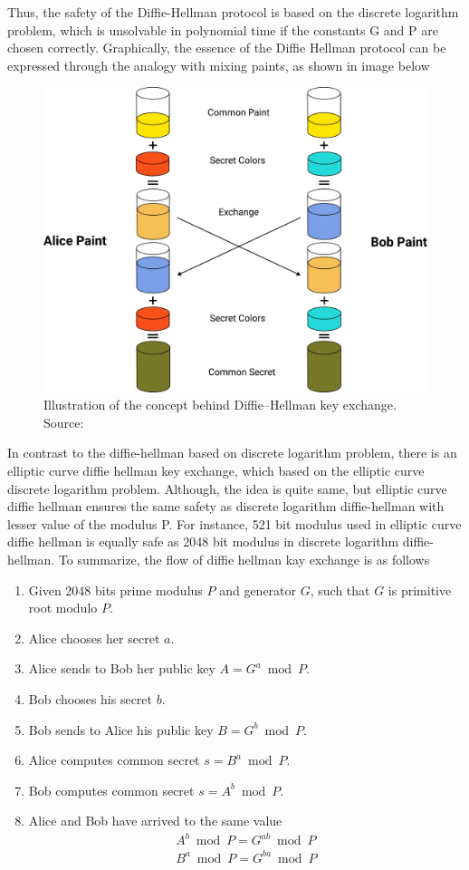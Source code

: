 Thus, the safety of the Diffie-Hellman protocol is based on the discrete logarithm problem, which is unsolvable
in polynomial time if the constants G and P are chosen correctly.
Graphically, the essence of the Diffie Hellman protocol can be expressed through the analogy with mixing paints, as shown in
image below
\begin{figure}[H]
    \centering
    \includegraphics[width=1\textwidth]{Pictures/Diffie-Hellman}
    \caption{Illustration of the concept behind Diffie–Hellman key exchange. Source: }\label{fig:figure4}
\end{figure}
In contrast to the diffie-hellman based on discrete logarithm problem, there is an elliptic curve diffie hellman
key exchange, which based on the elliptic curve discrete logarithm problem.
Although, the idea is quite same, but elliptic curve diffie hellman ensures the same safety as discrete logarithm
diffie-hellman with lesser value of the modulus P.
For instance, 521 bit modulus used in elliptic curve diffie hellman is equally safe as 2048 bit modulus in
discrete logarithm diffie-hellman.
To summarize, the flow of diffie hellman kay exchange is as follows
\begin{enumerate}
    \item Given 2048 bits prime modulus $P$ and generator $G$, such that $G$ is primitive root modulo $P$.
    \item Alice chooses her secret $a$.
    \item Alice sends to Bob her public key $A = G^a \bmod P$.
    \item Bob chooses his secret $b$.
    \item Bob sends to Alice his public key $B = G^b \bmod P$.
    \item Alice computes common secret $s = B^a \bmod P$.
    \item Bob computes common secret $s = A^b \bmod P$.
    \item Alice and Bob have arrived to the same value
    \begin{eqnarray*}
        A^b \bmod P = G^{ab} \bmod P \\
        B^a \bmod P = G^{ba} \bmod P
    \end{eqnarray*}
\end{enumerate}

